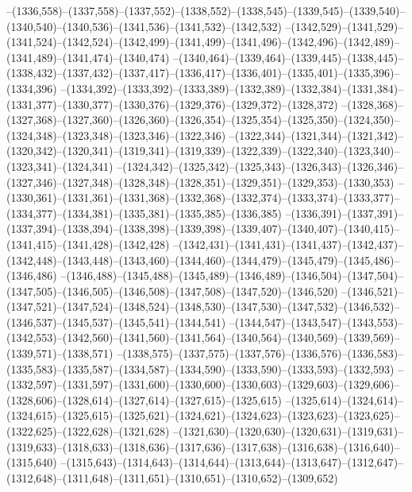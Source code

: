 --(1336,558)--(1337,558)--(1337,552)--(1338,552)--(1338,545)--(1339,545)--(1339,540)--(1340,540)--(1340,536)--(1341,536)--(1341,532)--(1342,532)
--(1342,529)--(1341,529)--(1341,524)--(1342,524)--(1342,499)--(1341,499)--(1341,496)--(1342,496)--(1342,489)--(1341,489)--(1341,474)--(1340,474)
--(1340,464)--(1339,464)--(1339,445)--(1338,445)--(1338,432)--(1337,432)--(1337,417)--(1336,417)--(1336,401)--(1335,401)--(1335,396)--(1334,396)
--(1334,392)--(1333,392)--(1333,389)--(1332,389)--(1332,384)--(1331,384)--(1331,377)--(1330,377)--(1330,376)--(1329,376)--(1329,372)--(1328,372)
--(1328,368)--(1327,368)--(1327,360)--(1326,360)--(1326,354)--(1325,354)--(1325,350)--(1324,350)--(1324,348)--(1323,348)--(1323,346)--(1322,346)
--(1322,344)--(1321,344)--(1321,342)--(1320,342)--(1320,341)--(1319,341)--(1319,339)--(1322,339)--(1322,340)--(1323,340)--(1323,341)--(1324,341)
--(1324,342)--(1325,342)--(1325,343)--(1326,343)--(1326,346)--(1327,346)--(1327,348)--(1328,348)--(1328,351)--(1329,351)--(1329,353)--(1330,353)
--(1330,361)--(1331,361)--(1331,368)--(1332,368)--(1332,374)--(1333,374)--(1333,377)--(1334,377)--(1334,381)--(1335,381)--(1335,385)--(1336,385)
--(1336,391)--(1337,391)--(1337,394)--(1338,394)--(1338,398)--(1339,398)--(1339,407)--(1340,407)--(1340,415)--(1341,415)--(1341,428)--(1342,428)
--(1342,431)--(1341,431)--(1341,437)--(1342,437)--(1342,448)--(1343,448)--(1343,460)--(1344,460)--(1344,479)--(1345,479)--(1345,486)--(1346,486)
--(1346,488)--(1345,488)--(1345,489)--(1346,489)--(1346,504)--(1347,504)--(1347,505)--(1346,505)--(1346,508)--(1347,508)--(1347,520)--(1346,520)
--(1346,521)--(1347,521)--(1347,524)--(1348,524)--(1348,530)--(1347,530)--(1347,532)--(1346,532)--(1346,537)--(1345,537)--(1345,541)--(1344,541)
--(1344,547)--(1343,547)--(1343,553)--(1342,553)--(1342,560)--(1341,560)--(1341,564)--(1340,564)--(1340,569)--(1339,569)--(1339,571)--(1338,571)
--(1338,575)--(1337,575)--(1337,576)--(1336,576)--(1336,583)--(1335,583)--(1335,587)--(1334,587)--(1334,590)--(1333,590)--(1333,593)--(1332,593)
--(1332,597)--(1331,597)--(1331,600)--(1330,600)--(1330,603)--(1329,603)--(1329,606)--(1328,606)--(1328,614)--(1327,614)--(1327,615)--(1325,615)
--(1325,614)--(1324,614)--(1324,615)--(1325,615)--(1325,621)--(1324,621)--(1324,623)--(1323,623)--(1323,625)--(1322,625)--(1322,628)--(1321,628)
--(1321,630)--(1320,630)--(1320,631)--(1319,631)--(1319,633)--(1318,633)--(1318,636)--(1317,636)--(1317,638)--(1316,638)--(1316,640)--(1315,640)
--(1315,643)--(1314,643)--(1314,644)--(1313,644)--(1313,647)--(1312,647)--(1312,648)--(1311,648)--(1311,651)--(1310,651)--(1310,652)--(1309,652)
